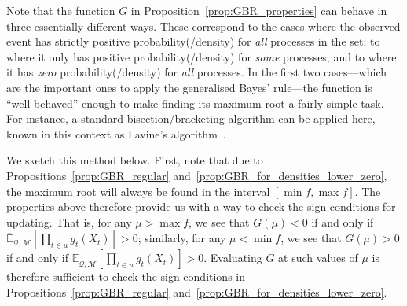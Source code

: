 \documentclass[twoside,11pt]{article}
\makeatletter
\newcommand{\reals}{\mathbb{R}}
\newcommand{\lexp}{\underline{\mathbb{E}}_{\rateset,\mathcal{M}}}
\newcommand{\uexp}{\overline{\mathbb{E}}_{\rateset,\mathcal{M}}}
\newcommand{\rateset}{\mathcal{Q}}
\newcommand{\customlabel}[2]{%
   \protected@write \@auxout {}{\string \newlabel {#1}{{#2}{\thepage}{#2}{#1}{}} }%
   \hypertarget{#1}{\emph{#2}\!}
}
\makeatother
\begin{document}
\begin{proposition}
%
%
%
\end{proposition}

Note that the function $G$ in Proposition~\ref{prop:GBR_properties} can behave in three essentially different ways. These correspond to the cases where the observed event has strictly positive probability(/density) for \emph{all} processes in the set; to where it only has positive probability(/density) for \emph{some} processes; and to where it has \emph{zero} probability(/density) for \emph{all} processes.
In the first two cases---which are the important ones to apply the generalised Bayes' rule---the function is ``well-behaved'' enough to make finding its maximum root a fairly simple task. For instance, a standard bisection/bracketing algorithm can be applied here, known in this context as Lavine's algorithm~\citep{cozman1997alternatives}.

We sketch this method below. First, note that due to Propositions~\ref{prop:GBR_regular} and~\ref{prop:GBR_for_densities_lower_zero}, the maximum root will always be found in the interval $[\min f, \max f]$. The properties above therefore provide us with a way to check the sign conditions for updating. That is, for any $\mu>\max f$, we see that $G(\mu)<0$ if and only if $\uexp[\prod_{t\in u} g_{t}(X_{t})]>0$; %
similarly, for any $\mu < \min f$, we see that $G(\mu)>0$ if and only if $\lexp[\prod_{t\in u} g_{t}(X_{t})]>0$. Evaluating $G$ at such values of $\mu$ is therefore sufficient to check the sign conditions in Propositions~\ref{prop:GBR_regular} and~\ref{prop:GBR_for_densities_lower_zero}.%
\end{document}
